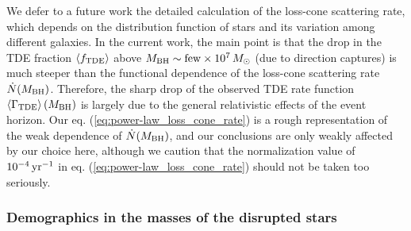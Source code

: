 \documentclass[useAMS,usenatbib]{mn2e}
\def\mr{\mathrm}
\def\msun{M_{\rm \odot}}
\def\mBH{M_{\rm BH}}
\def\rp{r_{\rm p}}
\def\GammaTDE{\Gamma_{\rm TDE}}
\def\Gammalc{\Gamma_{\rm lc}}
\def\fTDE{f_{\rm TDE}}
\def\tage{t_{\rm age}}
\newcommand{\lara}[1]{\left\langle{#1}\right\rangle}
\begin{document}
We defer to a future work the detailed calculation of the loss-cone scattering rate, which depends on the distribution function of stars and its variation among different galaxies. In the current work, the main point is that the drop in the TDE fraction $\lara{\fTDE}$ above $\mBH\sim \mr{few}\times 10^7\,\msun$ (due to direction captures) is much steeper than the functional dependence of the loss-cone scattering rate $\dot{N}(\mBH)$. Therefore, the sharp drop of the observed TDE rate function $\lara{\GammaTDE}(\mBH)$ \citep[see Figure 3 of][]{vanvelzen18_TDE_rate_suppression} is largely due to the general relativistic effects of the event horizon. Our eq. (\ref{eq:power-law_loss_cone_rate}) is a rough representation of the weak dependence of $\dot{N}(\mBH)$, and our conclusions are only weakly affected by our choice here, although we caution that the normalization value of $10^{-4}\rm\, yr^{-1}$ in eq. (\ref{eq:power-law_loss_cone_rate}) should not be taken too seriously.




\subsubsection{Demographics in the masses of the disrupted stars}
\end{document}
